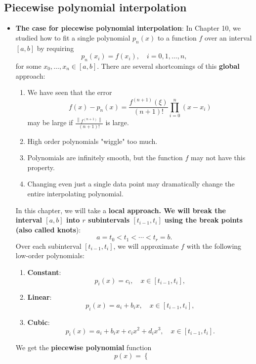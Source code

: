 \documentclass{report}
\begin{document}
    \subsection{Piecewise polynomial interpolation}
    \begin{itemize}
        \item \textbf{The case for piecewise polynomial interpolation}:
            In Chapter 10, we studied how to fit a single polynomial $p_n(x)$ to a function $f$ over an interval $[a,b]$ by requiring 
            $$p_n(x_i) = f(x_i), \quad i = 0,1,\ldots,n,$$
            for some $x_0,\ldots,x_n \in [a,b]$. There are several shortcomings of this \textbf{global} approach:
            \begin{enumerate}
                \item We have seen that the error
                    $$f(x) - p_n(x) = \frac{f^{(n+1)}(\xi)}{(n+1)!} \prod_{i=0}^n(x-x_i)$$
                    may be large if $\frac{\left\|f^{(n+1)}\right\|}{(n+1)!}$ is large.
                \item High order polynomials "wiggle" too much.
                \item Polynomials are infinitely smooth, but the function $f$ may not have this property.
                \item Changing even just a single data point may dramatically change the entire interpolating polynomial.
            \end{enumerate}
            In this chapter, we will take a \textbf{local\textbf{ approach. We will break the interval $[a,b]$ into $r$ subintervals $[t_{i-1}, t_{i}]$ using the \textbf{break points} (also called }knots}):
            $$a = t_0 < t_1 < \cdots < t_r = b.$$
            Over each subinterval $[t_{i-1}, t_{i}]$, we will approximate $f$ with the following low-order polynomials:
            \begin{enumerate}
                \item \textbf{Constant}:
                    $$p_i(x) = c_i, \quad x \in [t_{i-1}, t_{i}],$$
                \item \textbf{Linear}:
                    $$p_i(x) = a_i + b_i x, \quad x \in [t_{i-1}, t_{i}],$$
                \item \textbf{Cubic}:
                    $$p_i(x) = a_i + b_ix + c_ix^2 + d_ix^3, \quad x \in [t_{i-1}, t_{i}].$$
            \end{enumerate}
            We get the \textbf{piecewise polynomial} function
            $$
            p(x) = 
            \begin{cases}

\end{cases}$$
\end{itemize}
\end{document}
